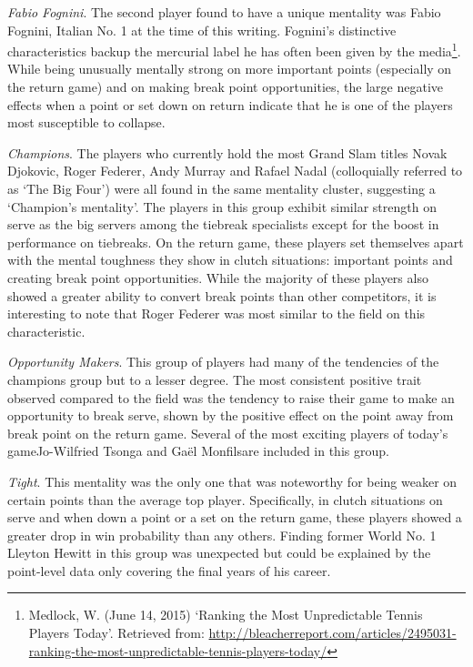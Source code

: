 \documentclass{Latex/svjour3}
\begin{document}
\textit{Fabio Fognini}. The second player found to have a unique mentality was
Fabio Fognini, Italian No. 1 at the time of this writing. Fognini's distinctive
characteristics backup the mercurial label he has often been given by the
media\footnote{Medlock, W. (June 14, 2015) `Ranking the Most Unpredictable
  Tennis Players Today'. Retrieved from:
  \url{http://bleacherreport.com/articles/2495031-ranking-the-most-unpredictable-tennis-players-today/}}. While
being unusually mentally strong on more important points (especially on the
return game) and on making break point opportunities, the large negative effects
when a point or set down on return indicate that he is one of the players most
susceptible to collapse.

\textit{Champions}. The players who currently hold the most Grand Slam titles
Novak Djokovic, Roger Federer, Andy Murray and Rafael Nadal (colloquially
referred to as `The Big Four') were all found in the same mentality cluster,
suggesting a `Champion's mentality'. The players in this group exhibit similar
strength on serve as the big servers among the tiebreak specialists except for
the boost in performance on tiebreaks. On the return game, these players set
themselves apart with the mental toughness they show in clutch situations:
important points and creating break point opportunities. While the majority of
these players also showed a greater ability to convert break points than other
competitors, it is interesting to note that Roger Federer was most similar to
the field on this characteristic.

\textit{Opportunity Makers}. This group of players had many of the tendencies of
the champions group but to a lesser degree. The most consistent positive trait
observed compared to the field was the tendency to raise their game to make an
opportunity to break serve, shown by the positive effect on the point away from
break point on the return game. Several of the most exciting players of today's
game\textemdash Jo-Wilfried Tsonga and Ga\"{e}l Monfils\textemdash are included
in this group. 

\textit{Tight}. This mentality was the only one that was noteworthy for being
weaker on certain points than the average top player. Specifically, in clutch
situations on serve and when down a point or a set on the return game, these
players showed a greater drop in win probability than any others. Finding former
World No. 1 Lleyton Hewitt in this group was unexpected but could be explained
by the point-level data only covering the final years of his
career.
\end{document}
